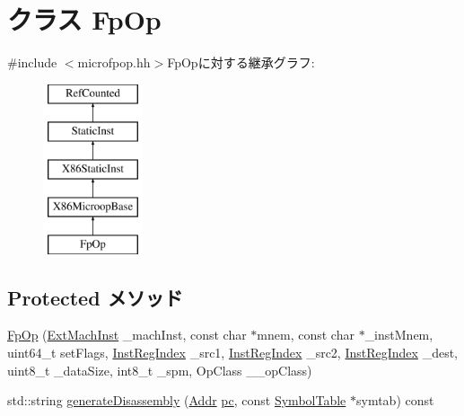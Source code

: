 \hypertarget{classX86ISA_1_1FpOp}{
\section{クラス FpOp}
\label{classX86ISA_1_1FpOp}
}


{\ttfamily \#include $<$microfpop.hh$>$}FpOpに対する継承グラフ:\begin{figure}[H]
\begin{center}
\leavevmode
\includegraphics[height=5cm]{classX86ISA_1_1FpOp}
\end{center}
\end{figure}
\subsection*{Protected メソッド}
\begin{DoxyCompactItemize}
\item 
\hyperlink{classX86ISA_1_1FpOp_aa567fa664fbeb3d523131d0f5d2c88c7}{FpOp} (\hyperlink{structX86ISA_1_1ExtMachInst}{ExtMachInst} \_\-machInst, const char $\ast$mnem, const char $\ast$\_\-instMnem, uint64\_\-t setFlags, \hyperlink{structX86ISA_1_1InstRegIndex}{InstRegIndex} \_\-src1, \hyperlink{structX86ISA_1_1InstRegIndex}{InstRegIndex} \_\-src2, \hyperlink{structX86ISA_1_1InstRegIndex}{InstRegIndex} \_\-dest, uint8\_\-t \_\-dataSize, int8\_\-t \_\-spm, OpClass \_\-\_\-opClass)
\item 
std::string \hyperlink{classX86ISA_1_1FpOp_a95d323a22a5f07e14d6b4c9385a91896}{generateDisassembly} (\hyperlink{base_2types_8hh_af1bb03d6a4ee096394a6749f0a169232}{Addr} \hyperlink{namespaceX86ISA_aecb63c74e066ecd98e04d057e39028c9}{pc}, const \hyperlink{classSymbolTable}{SymbolTable} $\ast$symtab) const 
\end{DoxyCompactItemize}
